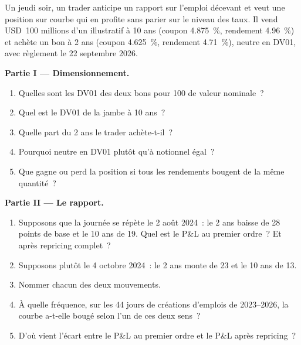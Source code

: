 \begin{problem}\label{pb:m2:reading-a-macro-calendar-and-a-rates-screen:1}
Un jeudi soir, un trader anticipe un rapport sur l'emploi décevant et veut une position sur courbe
qui en profite sans parier sur le niveau des taux. Il vend USD~100 millions d'un
 illustratif à 10 ans (coupon 4.875~\%, rendement 4.96~\%) et achète un bon à 2 ans (coupon
4.625~\%, rendement 4.71~\%), neutre en DV01, avec règlement le 22 septembre 2026.

\medskip\noindent\textbf{Partie I --- Dimensionnement.}
\begin{enumerate}
\item Quelles sont les DV01 des deux bons pour 100 de valeur nominale~?
\item Quel est le DV01 de la jambe à 10 ans~?
\item Quelle part du 2 ans le trader achète-t-il~?
\item Pourquoi neutre en DV01 plutôt qu'à notionnel égal~?
\item Que gagne ou perd la position si tous les rendements bougent de la même quantité~?
\end{enumerate}

\medskip\noindent\textbf{Partie II --- Le rapport.}
\begin{enumerate}[resume]
\item Supposons que la journée se répète le 2 août 2024~: le 2 ans baisse de 28 points de base et le 10 ans
de 19. Quel est le P\&L au premier ordre~? Et après repricing complet~?
\item Supposons plutôt le 4 octobre 2024~: le 2 ans monte de 23 et le 10 ans de 13.
\item Nommer chacun des deux mouvements.
\item À quelle fréquence, sur les 44 jours de créations d'emplois de 2023--2026, la courbe a-t-elle bougé selon l'un de ces deux
sens~?
\item D'où vient l'écart entre le P\&L au premier ordre et le P\&L après repricing~?
\end{enumerate}


\end{problem}
